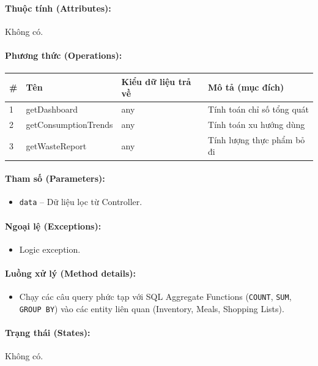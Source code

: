 \documentclass[12pt,a4paper]{article}
\begin{document}
\paragraph{Thuộc tính (Attributes):}
Không có.

\paragraph{Phương thức (Operations):}
\begin{longtable}{|p{0.6cm}|p{5.0cm}|p{2.8cm}|p{5.4cm}|}
\hline
\textbf{\#} & \textbf{Tên} & \textbf{Kiểu dữ liệu trả về} & \textbf{Mô tả (mục đích)} \\ \hline
\endhead
1 & getDashboard & any & Tính toán chỉ số tổng quát \\ \hline
2 & getConsumptionTrends & any & Tính toán xu hướng dùng \\ \hline
3 & getWasteReport & any & Tính lượng thực phẩm bỏ đi \\ \hline
\end{longtable}

\paragraph{Tham số (Parameters):}
\begin{itemize}[leftmargin=*]
    \item \texttt{data} – Dữ liệu lọc từ Controller.
\end{itemize}


\paragraph{Ngoại lệ (Exceptions):}
\begin{itemize}[leftmargin=*]
    \item Logic exception.
\end{itemize}


\paragraph{Luồng xử lý (Method details):}
\begin{itemize}[leftmargin=*]
    \item Chạy các câu query phức tạp với SQL Aggregate Functions (\texttt{COUNT}, \texttt{SUM}, \texttt{GROUP BY}) vào các entity liên quan (Inventory, Meals, Shopping Lists).
\end{itemize}


\paragraph{Trạng thái (States):}
Không có.
\end{document}
